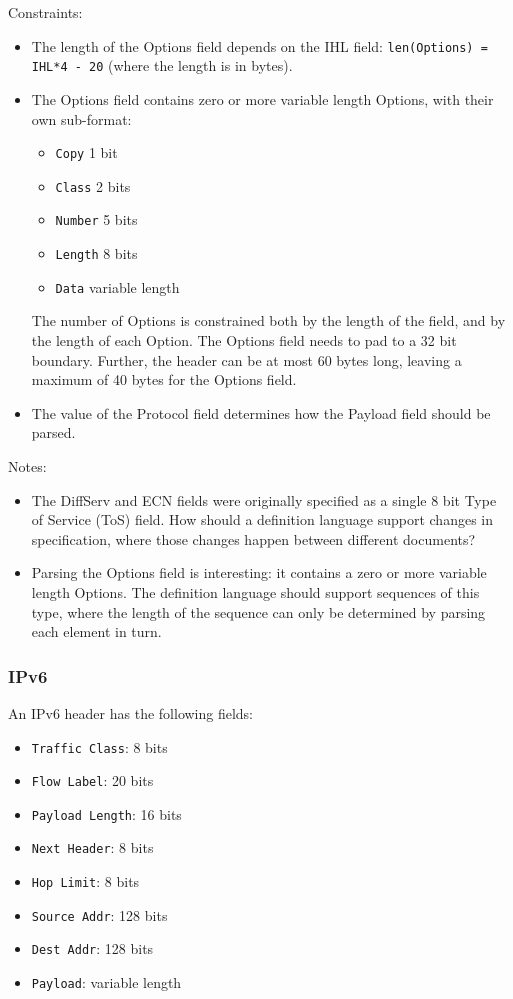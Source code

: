 \documentclass[10pt,a4paper]{article}
\begin{document}
Constraints:
\begin{itemize}
\item The length of the Options field depends on the IHL field:
\texttt{len(Options) = IHL*4 - 20} (where the length is in bytes).
\item The Options field contains zero or more variable length Options, with their own
sub-format:
\begin{itemize}
\item \texttt{Copy} 1 bit
\item \texttt{Class} 2 bits
\item \texttt{Number} 5 bits
\item \texttt{Length} 8 bits
\item \texttt{Data} variable length
\end{itemize}
The number of Options is constrained both by the length of the field, and by the length
of each Option. The Options field needs to pad to a 32 bit boundary. Further, the
header can be at most 60 bytes long, leaving a maximum of 40 bytes for the Options field.
\item The value of the Protocol field determines how the Payload field should be parsed.
\end{itemize}

Notes:
\begin{itemize}
\item The DiffServ and ECN fields were originally specified as a single 8 bit 
Type of Service (ToS) field. How should a definition language support changes in
specification, where those changes happen between different documents?
\item Parsing the Options field is interesting: it contains a zero or more variable
length Options. The definition language should support sequences of this type, where the
length of the sequence can only be determined by parsing each element in turn.
\end{itemize}

\subsubsection{IPv6}

An IPv6 header has the following fields:
\begin{itemize}
\item \texttt{Traffic Class}: 8 bits
\item \texttt{Flow Label}: 20 bits
\item \texttt{Payload Length}: 16 bits
\item \texttt{Next Header}: 8 bits
\item \texttt{Hop Limit}: 8 bits
\item \texttt{Source Addr}: 128 bits
\item \texttt{Dest Addr}: 128 bits
\item \texttt{Payload}: variable length
\end{itemize}
\end{document}
